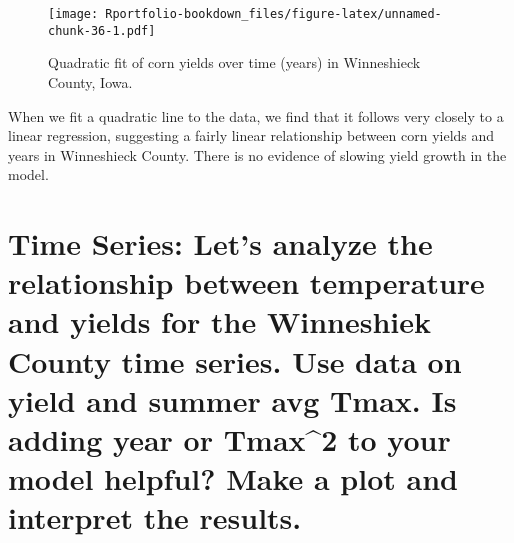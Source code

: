 \documentclass[
]{book}
\newenvironment{Shaded}{\begin{snugshade}}{\end{snugshade}}
\newcommand{\AttributeTok}[1]{\textcolor[rgb]{0.77,0.63,0.00}{#1}}
\newcommand{\CommentTok}[1]{\textcolor[rgb]{0.56,0.35,0.01}{\textit{#1}}}
\newcommand{\FunctionTok}[1]{\textcolor[rgb]{0.00,0.00,0.00}{#1}}
\newcommand{\NormalTok}[1]{#1}
\newcommand{\OtherTok}[1]{\textcolor[rgb]{0.56,0.35,0.01}{#1}}
\newcommand{\SpecialCharTok}[1]{\textcolor[rgb]{0.00,0.00,0.00}{#1}}
\newcommand{\StringTok}[1]{\textcolor[rgb]{0.31,0.60,0.02}{#1}}
\begin{document}
\begin{Shaded}
\end{Shaded}

\begin{figure}
\centering
\texttt{[image: Rportfolio-bookdown\_files/figure-latex/unnamed-chunk-36-1.pdf]}
\caption{\label{fig:unnamed-chunk-36}Quadratic fit of corn yields over time (years) in Winneshieck County, Iowa.}
\end{figure}

When we fit a quadratic line to the data, we find that it follows very closely to a linear regression, suggesting a fairly linear relationship between corn yields and years in Winneshieck County. There is no evidence of slowing yield growth in the model.

\hypertarget{time-series-lets-analyze-the-relationship-between-temperature-and-yields-for-the-winneshiek-county-time-series.-use-data-on-yield-and-summer-avg-tmax.-is-adding-year-or-tmax2-to-your-model-helpful-make-a-plot-and-interpret-the-results.}{%
\section{Time Series: Let's analyze the relationship between temperature and yields for the Winneshiek County time series. Use data on yield and summer avg Tmax. Is adding year or Tmax\^{}2 to your model helpful? Make a plot and interpret the results.}\label{time-series-lets-analyze-the-relationship-between-temperature-and-yields-for-the-winneshiek-county-time-series.-use-data-on-yield-and-summer-avg-tmax.-is-adding-year-or-tmax2-to-your-model-helpful-make-a-plot-and-interpret-the-results.}}
\end{document}
